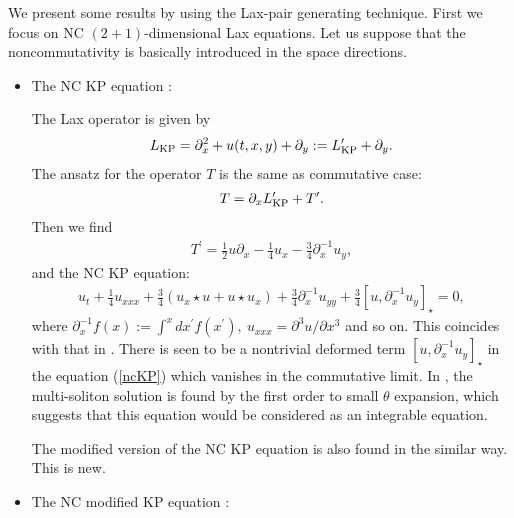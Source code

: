 \documentclass[a4paper,12pt]{article}\setlength{\topmargin}{-1cm}
\begin{document}
We present some results by using the Lax-pair generating technique.
First we focus on NC $(2+1)$-dimensional
Lax equations.
Let us suppose that the noncommutativity is basically
introduced in the space directions.  
\begin{itemize}

\item The NC KP equation 
\cite{Paniak} :

The Lax operator is given by
\begin{eqnarray}
L_{\scriptsize\mbox{KP}}=\partial_x^2+u(t,x,y)+\partial_y
:=L_{\scriptsize\mbox{KP}}^\prime+\partial_y.
\end{eqnarray}
The ansatz for the operator $T$ is the same as commutative case:
\begin{eqnarray}
T=\partial_x L_{\scriptsize\mbox{KP}}^\prime+T^\prime.
\end{eqnarray}
Then we find
\begin{eqnarray}
T^\prime=\frac{1}{2}u\partial_x-\frac{1}{4}u_x-\frac{3}{4}\partial_x^{-1}u_y,
\end{eqnarray}
and the NC KP equation:
\begin{eqnarray}
\label{ncKP}
u_t+\frac{1}{4}u_{xxx}+\frac{3}{4}(u_x\star u+u\star u_x)
+\frac{3}{4}\partial_x^{-1}u_{yy}
+\frac{3}{4}[u,\partial_x^{-1} u_y]_\star
=0,
\end{eqnarray}
where $\partial_x^{-1}f(x):=\int^x dx^\prime f(x^\prime),
~u_{xxx}=\partial^3 u/\partial x^3$ and so on.
This coincides with that in \cite{Paniak}.
There is seen to be a nontrivial deformed term $[u,\partial_x^{-1} u_y]_\star$
in the equation (\ref{ncKP}) which vanishes in the commutative limit.
In \cite{Paniak}, the multi-soliton solution is found
by the first order to small $\theta$ expansion,
which suggests that this equation would be considered as an 
integrable equation.

The modified version of the NC KP equation is also found
in the similar way. This is new.

\item The NC modified KP equation 
:


\end{itemize}
\end{document}
